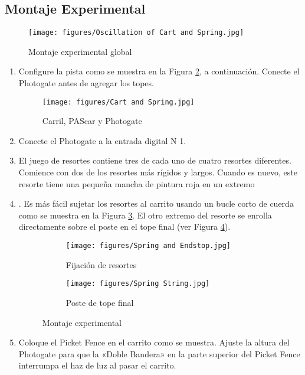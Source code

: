 \documentclass[9pt,a4paper,twocolumn,twoside]{tau-class/tau}
\begin{document}
\subsection{Montaje Experimental}
\begin{figure}[htbp]
    \centering
    \hfill
    \texttt{[image: figures/Oscillation of Cart and Spring.jpg]}
    \caption{Montaje experimental global}
    \label{fig:01}
\end{figure}
\begin{enumerate}
    \item Configure la pista como se muestra en la Figura \textcolor{blue}{\ref{fig:02}}, a continuación. Conecte el Photogate antes de agregar los topes.
    \begin{figure}[htbp]
        \centering
        \texttt{[image: figures/Cart and Spring.jpg]}
        \caption{Carril, PAScar y Photogate}
        \label{fig:02}
    \end{figure}
    \item Conecte el Photogate a la entrada digital N 1.
    \item El juego de resortes contiene tres de cada uno de cuatro resortes diferentes. Comience con dos de los resortes más rígidos y largos. Cuando es nuevo, este resorte tiene una pequeña mancha de pintura roja en un extremo
    \item . Es más fácil sujetar los resortes al carrito usando un bucle corto de cuerda como se muestra en la Figura \textcolor{blue}{\ref{fig:3a}}. El otro extremo del resorte se enrolla directamente sobre el poste en el tope final (ver Figura \textcolor{blue}{\ref{fig:3b}}).
    \begin{figure}[htbp]
         \centering
         \hfill
         \begin{subfigure}[b]{0.44\linewidth}
             \centering
             \texttt{[image: figures/Spring and Endstop.jpg]}
             \caption{ Fijación  de  resortes}
             \label{fig:3a}
         \end{subfigure}
         \begin{subfigure}[b]{0.48\linewidth}
             \centering
             \texttt{[image: figures/Spring String.jpg]}
             \caption{ Poste  de  tope  final}
             \label{fig:3b}
         \end{subfigure}
        \caption{Montaje experimental}
        \label{fig:montaje_experimental}
    \end{figure}
    \item Coloque el Picket Fence en el carrito como se muestra. Ajuste la altura del Photogate para que la «Doble Bandera» en la parte superior del Picket Fence interrumpa el haz de luz al pasar el carrito.

\end{enumerate}
\end{document}
